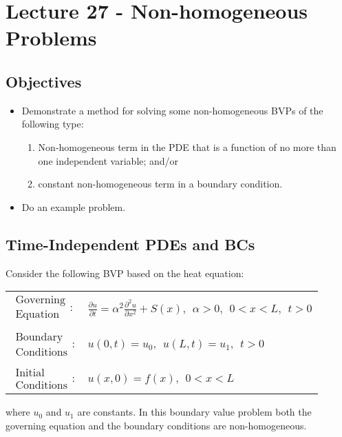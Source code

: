 \chapter{Lecture 27 - Non-homogeneous Problems}
\label{ch:lec27}
\section{Objectives}
\begin{itemize}
\item Demonstrate a method for solving some non-homogeneous BVPs of the following type:
\begin{enumerate}
\item Non-homogeneous term in the PDE that is a function of no more than one independent variable; and/or
\item constant non-homogeneous term in a boundary condition.
\end{enumerate}
\item Do an example problem.
\end{itemize}
\setcounter{lstannotation}{0} %

\section{Time-Independent PDEs and BCs}
Consider the following BVP based on the heat equation:
\begin{table}
\begin{tabular}{l l}
$\substack{\text{Governing} \\\text{Equation}}: $& $\frac{\partial u}{\partial t} = \alpha^2 \frac{\partial^2 u}{\partial x^2} + S(x), \ \ \alpha>0, \ \ 0<x<L, \ \ t>0$ \\
& \\
$\substack{\text{Boundary} \\ \text{Conditions}}: $& $u(0,t)=u_0, \ \ u(L,t) = u_1, \ \ t>0$\\
& \\
$\substack{\text{Initial} \\ \text{Conditions}}: $ & $u(x,0) = f(x), \ \ 0<x<L $ \\
\end{tabular}
\end{table}

\noindent where $u_0$ and $u_1$ are constants.  In this boundary value problem both the governing equation and the boundary conditions are non-homogeneous.  


